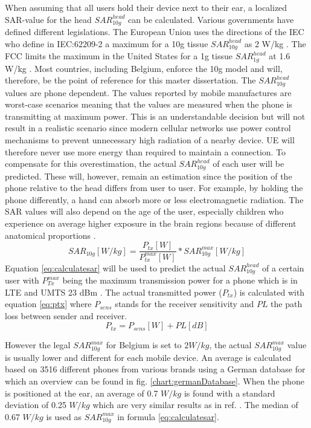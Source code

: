 When assuming that all users hold their device next to their ear, a localized SAR-value for the head $SAR^{head}_{10g}$ can be calculated.
Various governments have defined different legislations.
The European Union uses the directions of the  \acs{IEC} who
 define in IEC:62209-2 a maximum for a 10g tissue $SAR^{head}_{10g}$ as 2 W/kg \cite{J23}.
The \acs{FCC} limits the maximum in the United States for a 1g tissue $SAR^{head}_{1g}$ at 1.6 W/kg \cite{S15_SARFCC}.
Most countries, including Belgium, enforce the 10g model and will, therefore, be the point of reference for this master dissertation.
The $SAR^{head}_{10g}$ values are phone dependent. The values reported by mobile manufactures are worst-case scenarios meaning that the 
values are measured when the phone is transmitting at maximum power. This is an understandable decision but will not result in a realistic scenario since 
modern cellular networks use power control mechanisms to prevent unnecessary high radiation of a nearby device. \gls{UE} will therefore never use more energy than 
required to maintain a connection.
To compensate for this overestimation, the actual $SAR^{head}_{10g}$ of each user will be predicted. These will, however, remain an estimation since the 
position of the phone relative to the head differs from user to user. For example, by holding the phone differently, a hand can absorb more or less 
electromagnetic radiation. The \gls{SAR} values will also depend on the age of the user, especially children who experience on average higher exposure in 
the brain regions because of different anatomical proportions \cite{J26_SARtissueage, J10_RDP}.
\begin{equation}
{SAR}_{10g}[W/kg] = \frac{P_{tx} [W]}{P^{max}_{tx} [W]} * {SAR}^{max}_{10g} [W/kg]
\label{eq:calculatesar}
\end{equation}
Equation \ref{eq:calculatesar} will be used to predict the actual $SAR^{head}_{10g}$  of a certain user with 
$P^{max}_{Tx}$ being the maximum transmission power for a phone which is in \gls{LTE} and UMTS 23 dBm \cite{J11_maxTpxUE, J10_RDP}.
The actual transmitted power ($P_{tx}$) is calculated with equation \ref{eq:ptx} where $P_{sens}$
stands for the receiver sensitivity and $PL$ the path loss between sender and receiver.
\begin{equation}
P_{tx} = P_{sens} [W] + PL [dB]
\label{eq:ptx}
\end{equation}
 
However the legal $SAR^{max}_{10g}$ for Belgium is set to $2 W/kg$,  the actual  $SAR^{max}_{10g}$ value is usually lower and different for each mobile device. 
An average is calculated based on 3516 different phones from various brands using a German database \cite{SARDatabase} for which an overview can be 
found in fig. \ref{chart:germanDatabase}.
When the phone is positioned at the ear, an average of 0.7 $W/kg$ is found with a standard deviation of 0.25 $W/kg$ which are very similar 
results as in ref. \cite{j10.1.1}. The median of 0.67  $W/kg$ is used as $SAR^{max}_{10g}$ in formula \ref{eq:calculatesar}.

